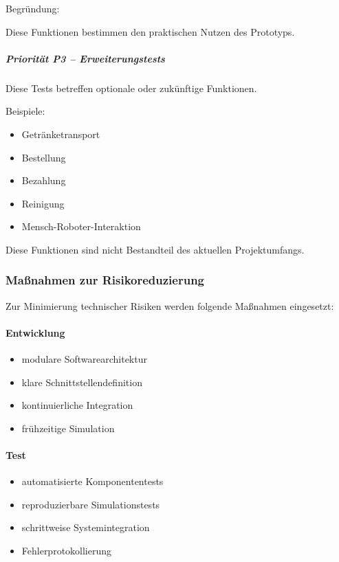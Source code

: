 Begründung:

Diese Funktionen bestimmen den praktischen Nutzen des Prototyps.

\subparagraph{Priorität P3 --
Erweiterungstests}\label{priorituxe4t-p3-erweiterungstests}

Diese Tests betreffen optionale oder zukünftige Funktionen.

Beispiele:

\begin{itemize}
\tightlist
\item
  Getränketransport
\item
  Bestellung
\item
  Bezahlung
\item
  Reinigung
\item
  Mensch-Roboter-Interaktion
\end{itemize}

Diese Funktionen sind nicht Bestandteil des aktuellen Projektumfangs.

\subsubsection{Maßnahmen zur
Risikoreduzierung}\label{mauxdfnahmen-zur-risikoreduzierung}

Zur Minimierung technischer Risiken werden folgende Maßnahmen
eingesetzt:

\paragraph{Entwicklung}\label{entwicklung}

\begin{itemize}
\tightlist
\item
  modulare Softwarearchitektur
\item
  klare Schnittstellendefinition
\item
  kontinuierliche Integration
\item
  frühzeitige Simulation
\end{itemize}

\paragraph{Test}\label{test}

\begin{itemize}
\tightlist
\item
  automatisierte Komponententests
\item
  reproduzierbare Simulationstests
\item
  schrittweise Systemintegration
\item
  Fehlerprotokollierung
\end{itemize}

